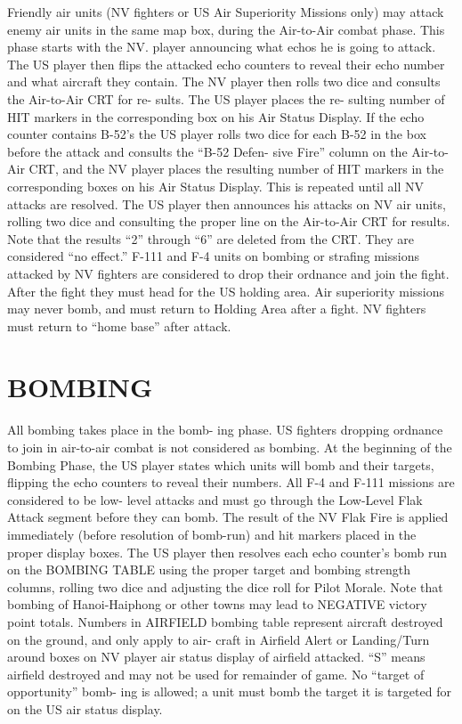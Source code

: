Friendly air units (NV fighters or US
Air Superiority Missions only) may
attack enemy air units in the same
map box, during the Air-to-Air
combat phase. This phase starts with
the NV. player announcing what
echos he is going to attack. The US
player then flips the attacked echo
counters to reveal their echo number
and what aircraft they contain. The
NV player then rolls two dice and
consults the Air-to-Air CRT for re-
sults. The US player places the re-
sulting number of HIT markers in the
corresponding box on his Air Status
Display. If the echo counter contains
B-52’s the US player rolls two dice
for each B-52 in the box before the
attack and consults the ``B-52 Defen-
sive Fire'' column on the Air-to-Air
CRT, and the NV player places the
resulting number of HIT markers in
the corresponding boxes on his Air
Status Display. This is repeated
until all NV attacks are resolved.
The US player then announces his
attacks on NV air units, rolling two
dice and consulting the proper line
on the Air-to-Air CRT for results.
Note that the results “2” through
“6” are deleted from the CRT. They
are considered “no effect.”
F-111 and F-4 units on bombing or
strafing missions attacked by NV
fighters are considered to drop their
ordnance and join the fight. After
the fight they must head for the US
holding area.
Air superiority missions may never
bomb, and must return to Holding
Area after a fight.
NV fighters must return to “home
base” after attack.

\section*{BOMBING}
All bombing takes place in the bomb-
ing phase. US fighters dropping
ordnance to join in air-to-air combat is
not considered as bombing.
At the beginning of the Bombing
Phase, the US player states which
units will bomb and their targets,
flipping the echo counters to reveal
their numbers. All F-4 and F-111
missions are considered to be low-
level attacks and must go through the
Low-Level Flak Attack segment before
they can bomb. The result of the NV
Flak Fire is applied immediately
(before resolution of bomb-run) and
hit markers placed in the proper
display boxes.
The US player then resolves each
echo counter’s bomb run on the
BOMBING TABLE using the proper
target and bombing strength columns,
rolling two dice and adjusting the
dice roll for Pilot Morale. Note that
bombing of Hanoi-Haiphong or other
towns may lead to NEGATIVE
victory point totals.
Numbers in AIRFIELD bombing
table represent aircraft destroyed on
the ground, and only apply to air-
craft in Airfield Alert or Landing/Turn
around boxes on NV player air status
display of airfield attacked. “S”
means airfield destroyed and may not
be used for remainder of game.
No “target of opportunity” bomb-
ing is allowed; a unit must bomb the
target it is targeted for on the US air
status display.

